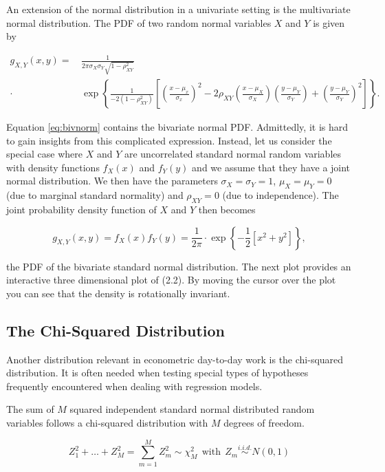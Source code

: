 \documentclass[]{book}
\theoremstyle{definition}
\theoremstyle{definition}
\theoremstyle{definition}
\theoremstyle{remark}
\begin{document}
An extension of the normal distribution in a univariate setting is the
multivariate normal distribution. The PDF of two random normal variables
\(X\) and \(Y\) is given by

\begin{align}
g_{X,Y}(x,y) =& \, \frac{1}{2\pi\sigma_X\sigma_Y\sqrt{1-\rho_{XY}^2}} \\ 
\cdot & \, \exp \left\{ \frac{1}{-2(1-\rho_{XY}^2)} \left[ \left( \frac{x-\mu_x}{\sigma_x} \right)^2 - 2\rho_{XY}\left( \frac{x-\mu_X}{\sigma_X} \right)\left( \frac{y-\mu_Y}{\sigma_Y} \right) + \left( \frac{y-\mu_Y}{\sigma_Y} \right)^2 \right]  \right\}. \label{eq:bivnorm}
\end{align}

Equation \eqref{eq:bivnorm} contains the bivariate normal PDF. Admittedly,
it is hard to gain insights from this complicated expression. Instead,
let us consider the special case where \(X\) and \(Y\) are uncorrelated
standard normal random variables with density functions \(f_X(x)\) and
\(f_Y(y)\) and we assume that they have a joint normal distribution. We
then have the parameters \(\sigma_X = \sigma_Y = 1\), \(\mu_X=\mu_Y=0\)
(due to marginal standard normality) and \(\rho_{XY}=0\) (due to
independence). The joint probability density function of \(X\) and \(Y\)
then becomes

\[ g_{X,Y}(x,y) = f_X(x) f_Y(y) = \frac{1}{2\pi} \cdot \exp \left\{ -\frac{1}{2} \left[x^2 + y^2 \right]  \right\}, \tag{2.2}  \]

the PDF of the bivariate standard normal distribution. The next plot
provides an interactive three dimensional plot of (2.2). By moving the
cursor over the plot you can see that the density is rotationally
invariant.

\subsection*{The Chi-Squared
Distribution}\label{the-chi-squared-distribution}

Another distribution relevant in econometric day-to-day work is the
chi-squared distribution. It is often needed when testing special types
of hypotheses frequently encountered when dealing with regression
models.

The sum of \(M\) squared independent standard normal distributed random
variables follows a chi-squared distribution with \(M\) degrees of
freedom.

\[ Z_1^2 + \dots + Z_M^2 = \sum_{m=1}^M Z_m^2 \sim \chi^2_M \ \ \text{with} \ \ Z_m \overset{i.i.d.}{\sim} N(0,1) \label{eq:chisq}\]
\end{document}
